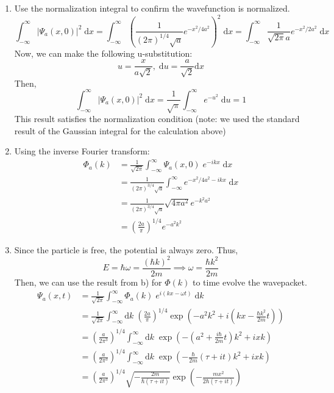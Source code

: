 \begin{sol}
\begin{enumerate}[label=\textbf{(\alph*)}]
\item Use the normalization integral to confirm the wavefunction is normalized.$$
	\int_{-\infty}^{\infty}|\Psi_a(x, 0)|^2\;\mathrm{d}x = \int_{-\infty}^{\infty}\left(\frac{1}{(2\pi)^{1/4}\sqrt{a}}e^{-x^2/4a^2}\right)^2\;\mathrm{d}x = \int_{-\infty}^{\infty} \frac{1}{\sqrt{2\pi}a}e^{-x^2/2a^2}\;\mathrm{d}x $$
Now, we can make the following u-substitution: $$u = \frac{x}{a\sqrt{2}},\;\mathrm{d}u = \frac{a}{\sqrt{2}}\mathrm{d}x$$Then, $$\int_{-\infty}^{\infty}|\Psi_a(x, 0)|^2\;\mathrm{d}x = \frac{1}{\sqrt{\pi}}\int_{-\infty}^{\infty}e^{-u^2}\;\mathrm{d}u = 1$$
This result satisfies the normalization condition (note: we used the standard result of the Gaussian integral for the calculation above)
\item Using the inverse Fourier transform: 
\begin{align*}
\Phi_a(k) &= \frac{1}{\sqrt{2\pi}}\int_{-\infty}^{\infty}\Psi_a(x, 0)\;e^{-ikx}\;\mathrm{d}x \\ &= \frac{1}{(2\pi)^{3/4}\sqrt{a}}\int_{-\infty}^{\infty}e^{-x^2/4a^2 - ikx}\;\mathrm{d}x \\ &= \frac{1}{(2\pi)^{3/4}\sqrt{a}}\sqrt{4\pi a^2}e^{-k^2a^2} \\ &= \left(\frac{2a}{\pi}\right)^{1/4}e^{-a^2k^2}
\end{align*}
\item Since the particle is free, the potential is always zero. Thus, $$E = \hbar\omega = \frac{(\hbar k)^2}{2m} \implies \omega = \frac{\hbar k^2}{2m}$$ Then, we can use the result from b) for $\Phi(k)$ to time evolve the wavepacket. 
\begin{align*}
\Psi_a(x, t) &= \frac{1}{\sqrt{2\pi}}\int_{-\infty}^{\infty}\Phi_a(k)\;e^{i(kx - \omega t)}\;\mathrm{d}k \\ &= \frac{1}{\sqrt{2\pi}}\int_{-\infty}^{\infty}\mathrm{d}k\;\left(\frac{2a}{\pi}\right)^{1/4}\operatorname{exp}(-a^2k^2 + i(kx - \frac{\hbar k^2}{2m}t)) \\ &= \left(\frac{a}{2\pi^3}\right)^{1/4}\int_{-\infty}^{\infty}\mathrm{d}k\;\operatorname{exp}(-(a^2 + \frac{i\hbar}{2m}t)k^2 + ixk) \\&= \left(\frac{a}{2\pi^3}\right)^{1/4}\int_{-\infty}^{\infty}\mathrm{d}k\;\operatorname{exp}(-\frac{\hbar}{2m}(\tau + it)k^2 + ixk) \\ &= \left(\frac{a}{2\pi^3}\right)^{1/4}\sqrt{-\frac{2m}{\hbar(\tau + it)}}\operatorname{exp}\left(-\frac{mx^2}{2\hbar(\tau + it)}\right)
\end{align*}
\end{enumerate}
\end{sol}
